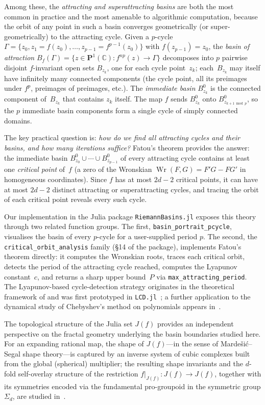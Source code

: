 \documentclass[12pt]{article}
\theoremstyle{definition}
\newcommand{\C}{\mathbb{C}}
\newcommand{\Pone}{\mathbf{P}^1(\C)}
\newcommand{\Jf}{J(f)}
\newcommand{\Bf}{B_f}
\DeclareMathOperator{\Wron}{Wr}
\begin{document}
Among these, the \emph{attracting and superattracting basins} are both the
most common in practice and the most amenable to algorithmic computation,
because the orbit of any point in such a basin converges geometrically (or
super-geometrically) to the attracting cycle.  Given a $p$-cycle
$\Gamma = \{z_0, z_1=f(z_0), \ldots, z_{p-1}=f^{p-1}(z_0)\}$ with
$f(z_{p-1})=z_0$, the \emph{basin of attraction}
$\Bf(\Gamma) = \{z\in\Pone : f^{np}(z)\to\Gamma\}$ decomposes into
$p$ pairwise disjoint $f$-invariant open sets $B_{z_k}$, one for each cycle
point~$z_k$; each~$B_{z_k}$ may itself have infinitely many connected
components (the cycle point, all its preimages under $f^p$, preimages of
preimages, etc.).  The \emph{immediate basin} $B^0_{z_k}$ is the connected
component of~$B_{z_k}$ that contains $z_k$ itself.  The map $f$ sends
$B^0_{z_k}$ onto $B^0_{z_{k+1\bmod p}}$, so the $p$ immediate basin
components form a single cycle of simply connected domains.

The key practical question is: \emph{how do we find all attracting cycles and
their basins, and how many iterations suffice?}  Fatou's theorem
\cite{Fatou1919,Fatou1920} provides the answer: the immediate basin
$B^0_{z_0}\cup\cdots\cup B^0_{z_{p-1}}$ of every attracting cycle contains
at least one \emph{critical point} of~$f$ (a zero of the Wronskian
$\Wron(F,G) = F'G - FG'$ in homogeneous coordinates).  Since $f$ has at
most $2d-2$ critical points, it can have at most $2d-2$ distinct attracting
or superattracting cycles, and tracing the orbit of each critical point
reveals every such cycle.

Our implementation in the Julia package \texttt{RiemannBasins.jl}
\cite{RiemannBasins} exposes this theory through two related function groups.
The first, \texttt{basin\_portrait\_pcycle}, visualises the basin of every
$p$-cycle for a user-supplied period $p$.  The second, the
\texttt{critical\_orbit\_analysis} family (§14 of the package), implements
Fatou's theorem directly: it computes the Wronskian roots, traces each
critical orbit, detects the period of the attracting cycle reached, computes
the Lyapunov constant~$c$, and returns a sharp upper bound~$P$ via
\texttt{max\_attracting\_period}.
The Lyapunov-based cycle-detection strategy originates in the theoretical
framework of \cite{AlvarezAparicio2023} and was first prototyped in
\texttt{LCD.jl}~\cite{LCD2022}; a further application to the dynamical study
of Chebyshev's method on polynomials appears in~\cite{AlvarezAparicio2023MMEHB}.

The topological structure of the Julia set $\Jf$ provides an independent
perspective on the fractal geometry underlying the basin boundaries studied
here.  For an expanding rational map, the shape of $\Jf$---in the sense of
Marde\v{s}i\'c--Segal shape theory---is captured by an inverse system of
cubic complexes built from the global (spherical) multiplier; the resulting
shape invariants and the $d$-fold self-overlay structure of the restriction
$f|_{\Jf}\colon\Jf\to\Jf$, together with its symmetries encoded via the
fundamental pro-groupoid in the symmetric group $\Sigma_d$, are studied
in~\cite{Extremiana2018Shape,Extremiana2018SelfOverlays}.
\end{document}
